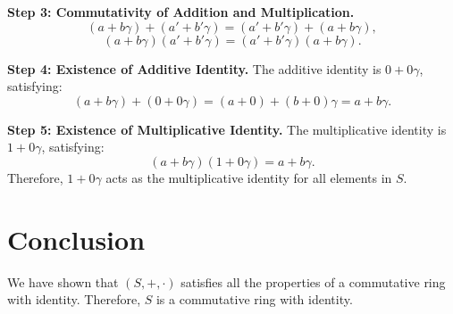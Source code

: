 \documentclass[12pt]{amsart}
\theoremstyle{definition}
\numberwithin{equation}{section}
\begin{document}
\begin{exercise}{1}
    \noindent \textbf{Step 3: Commutativity of Addition and Multiplication.}
    \[
    (a + b\gamma) + (a' + b'\gamma) = (a' + b'\gamma) + (a + b\gamma),
    \]
    \[
    (a + b\gamma)(a' + b'\gamma) = (a' + b'\gamma)(a + b\gamma).
    \]

    \noindent \textbf{Step 4: Existence of Additive Identity.}
    The additive identity is \(0 + 0\gamma \), satisfying:
    \[
    (a + b\gamma) + (0 + 0\gamma) = (a + 0) + (b + 0)\gamma = a + b\gamma.
    \]

    \noindent \textbf{Step 5: Existence of Multiplicative Identity.}
    The multiplicative identity is \(1 + 0\gamma \), satisfying:
    \[
    (a + b\gamma)(1 + 0\gamma) = a + b\gamma.
    \]
    Therefore, \(1 + 0\gamma \) acts as the multiplicative identity for all elements in \(S\).

    \section*{Conclusion}
    We have shown that \((S, +, \cdot)\) satisfies all the properties of a commutative ring with identity. Therefore, \(S\) is a commutative ring with identity.

\end{exercise}
\newpage
\end{document}
